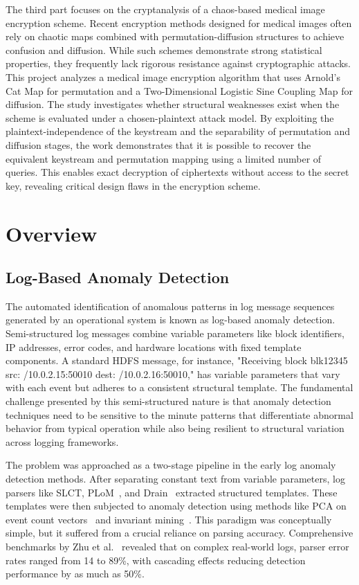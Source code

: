 The third part focuses on the cryptanalysis of a chaos-based medical image encryption scheme. Recent encryption methods designed for medical images often rely on chaotic maps combined with permutation-diffusion structures to achieve confusion and diffusion. While such schemes demonstrate strong statistical properties, they frequently lack rigorous resistance against cryptographic attacks. This project analyzes a medical image encryption algorithm that uses Arnold's Cat Map for permutation and a Two-Dimensional Logistic Sine Coupling Map for diffusion. The study investigates whether structural weaknesses exist when the scheme is evaluated under a chosen-plaintext attack model. By exploiting the plaintext-independence of the keystream and the separability of permutation and diffusion stages, the work demonstrates that it is possible to recover the equivalent keystream and permutation mapping using a limited number of queries. This enables exact decryption of ciphertexts without access to the secret key, revealing critical design flaws in the encryption scheme.

\section{Overview}

\subsection{Log-Based Anomaly Detection}

The automated identification of anomalous patterns in log message sequences generated by an operational system is known as log-based anomaly detection. Semi-structured log messages combine variable parameters like block identifiers, IP addresses, error codes, and hardware locations with fixed template components. A standard HDFS message, for instance, "Receiving block blk12345 src: /10.0.2.15:50010 dest: /10.0.2.16:50010," has variable parameters that vary with each event but adheres to a consistent structural template. The fundamental challenge presented by this semi-structured nature is that anomaly detection techniques need to be sensitive to the minute patterns that differentiate abnormal behavior from typical operation while also being resilient to structural variation across logging frameworks.

The problem was approached as a two-stage pipeline in the early log anomaly detection methods. After separating constant text from variable parameters, log parsers like SLCT, PLoM~\cite{makanju2009clustering}, and Drain~\cite{he2017drain} extracted structured templates. These templates were then subjected to anomaly detection using methods like PCA on event count vectors~\cite{xu2009detecting} and invariant mining~\cite{lou2010mining}. This paradigm was conceptually simple, but it suffered from a crucial reliance on parsing accuracy. Comprehensive benchmarks by Zhu et al.~\cite{zhu2019tools} revealed that on complex real-world logs, parser error rates ranged from 14 to 89\%, with cascading effects reducing detection performance by as much as 50\%.

